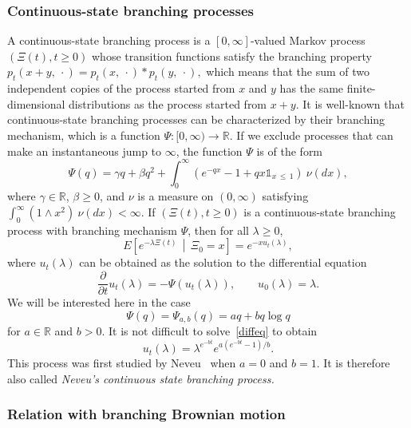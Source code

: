 \documentclass[10pt]{amsart}
\theoremstyle{definition}\newtheorem{defi}[theo]{Definition}\newtheorem{rema}[theo]{Remark}\newtheorem{exam}[theo]{Example}\newtheorem{exem}[theo]{Example}\newtheorem{nota}[theo]{Notation}
\newcommand*\R{\mathbb{R}}
\newcommand{\1} {\mathds{1}}
\begin{document}
\subsubsection{Continuous-state branching processes}
A continuous-state branching process is a $[0, \infty]$-valued Markov process $(\Xi(t), t \geq 0)$ whose transition functions satisfy the branching property $p_t(x + y, \: \cdot) = p_t(x, \: \cdot) * p_t(y, \: \cdot),$ which means that the sum of two independent copies of the process started from $x$ and $y$ has the same finite-dimensional distributions as the process started from $x + y$. It is well-known that continuous-state branching processes can be characterized by their branching mechanism, which is a function $\Psi: [0, \infty) \rightarrow \R$. If we exclude processes that can make an instantaneous jump to $\infty$, the function $\Psi$ is of the form
\[
\Psi(q) = \gamma q + \beta q^2 + \int_0^{\infty} \left(e^{-qx} - 1 + qx \1_{x\,\leq\,1}\right) \: \nu(dx),
\]
where $\gamma \in \R$, $\beta \geq 0$, and $\nu$ is a measure on $(0, \infty)$ satisfying $\int_0^{\infty} (1 \wedge x^2) \: \nu(dx) < \infty$. If $(\Xi(t), t \geq 0)$ is a continuous-state branching process with branching mechanism $\Psi$, then for all $\lambda \geq 0$,
\begin{equation}\label{csbpLaplace}
E\left[e^{-\lambda \Xi(t)} \,\middle| \, \Xi_0 = x\right] = e^{-x u_t(\lambda)},
\end{equation}
where $u_t(\lambda)$ can be obtained as the solution to the differential equation
\begin{equation}\label{diffeq}
\frac{\partial}{\partial t} u_t(\lambda) = -\Psi(u_t(\lambda)), \qquad u_0(\lambda) = \lambda.
\end{equation}
We will be interested here in the case
\begin{equation}\label{Psidef}
\Psi(q) = \Psi_{a,b}(q) = aq + bq \log q
\end{equation}
for $a \in \R$ and $b > 0$. It is not difficult to solve~\eqref{diffeq} to obtain
\begin{equation}\label{utlambda}
u_t(\lambda) = \lambda^{e^{-bt}} e^{a(e^{-bt} - 1)/b}.
\end{equation}
This process was first studied by Neveu~\cite{nev92} when $a = 0$ and $b = 1$. It is therefore also called \emph{Neveu's continuous state branching process.}

\subsubsection{Relation with branching Brownian motion}
\end{document}
